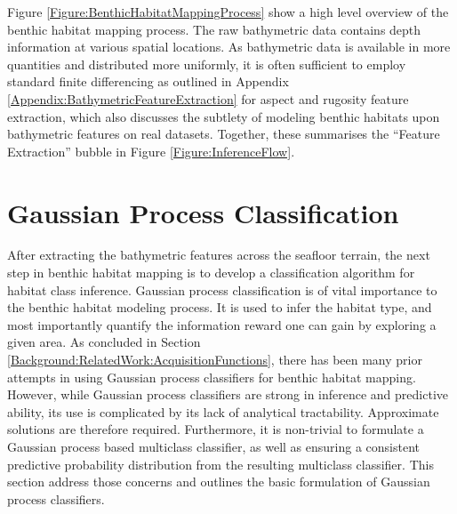 		Figure \ref{Figure:BenthicHabitatMappingProcess} show a high level overview of the benthic habitat mapping process. The raw bathymetric data contains depth information at various spatial locations. As bathymetric data is available in more quantities and distributed more uniformly, it is often sufficient to employ standard finite differencing as outlined in Appendix \ref{Appendix:BathymetricFeatureExtraction} for aspect and rugosity feature extraction, which also discusses the subtlety of modeling benthic habitats upon bathymetric features on real datasets. Together, these summarises the ``Feature Extraction'' bubble in Figure \ref{Figure:InferenceFlow}.
				
	\section{Gaussian Process Classification}
	\label{BenthicHabitatMapping:Classification}
	
		After extracting the bathymetric features across the seafloor terrain, the next step in benthic habitat mapping is to develop a classification algorithm for habitat class inference. Gaussian process classification is of vital importance to the benthic habitat modeling process. It is used to infer the habitat type, and most importantly quantify the information reward one can gain by exploring a given area. As concluded in Section \ref{Background:RelatedWork:AcquisitionFunctions}, there has been many prior attempts in using Gaussian process classifiers for benthic habitat mapping. However, while Gaussian process classifiers are strong in inference and predictive ability, its use is complicated by its lack of analytical tractability. Approximate solutions are therefore required. Furthermore, it is non-trivial to formulate a Gaussian process based multiclass classifier, as well as ensuring a consistent predictive probability distribution from the resulting multiclass classifier. This section address those concerns and outlines the basic formulation of Gaussian process classifiers.
		
